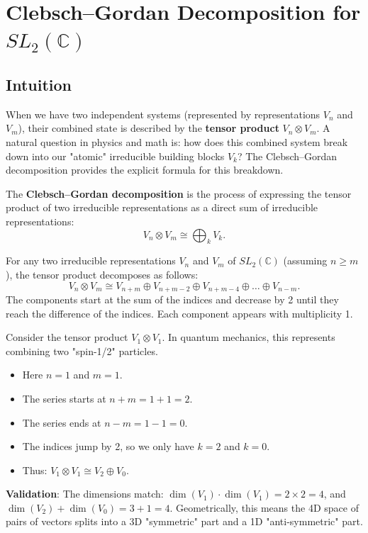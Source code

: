 \section{Clebsch--Gordan Decomposition for $SL_2(\mathbb{C})$}

\subsection{Intuition}
When we have two independent systems (represented by representations $V_n$ and $V_m$), their combined state is described by the \textbf{tensor product} $V_n \otimes V_m$. A natural question in physics and math is: how does this combined system break down into our "atomic" irreducible building blocks $V_k$? The Clebsch--Gordan decomposition provides the explicit formula for this breakdown.

\begin{definition}
The \textbf{Clebsch--Gordan decomposition} is the process of expressing the tensor product of two irreducible representations as a direct sum of irreducible representations:
\[ V_n \otimes V_m \cong \bigoplus_{k} V_k. \]
\end{definition}

\begin{theorem}
For any two irreducible representations $V_n$ and $V_m$ of $SL_2(\mathbb{C})$ (assuming $n \geq m$), the tensor product decomposes as follows:
\[ V_n \otimes V_m \cong V_{n+m} \oplus V_{n+m-2} \oplus V_{n+m-4} \oplus \dots \oplus V_{n-m}. \]
The components start at the sum of the indices and decrease by 2 until they reach the difference of the indices. Each component appears with multiplicity 1.
\end{theorem}

\begin{example}
Consider the tensor product $V_1 \otimes V_1$. In quantum mechanics, this represents combining two "spin-1/2" particles.
\begin{itemize}
    \item Here $n=1$ and $m=1$.
    \item The series starts at $n+m = 1+1 = 2$.
    \item The series ends at $n-m = 1-1 = 0$.
    \item The indices jump by 2, so we only have $k=2$ and $k=0$.
    \item Thus: $V_1 \otimes V_1 \cong V_2 \oplus V_0$.
\end{itemize}
\textbf{Validation}: The dimensions match: $\dim(V_1) \cdot \dim(V_1) = 2 \times 2 = 4$, and $\dim(V_2) + \dim(V_0) = 3 + 1 = 4$. Geometrically, this means the 4D space of pairs of vectors splits into a 3D "symmetric" part and a 1D "anti-symmetric" part.
\end{example}

